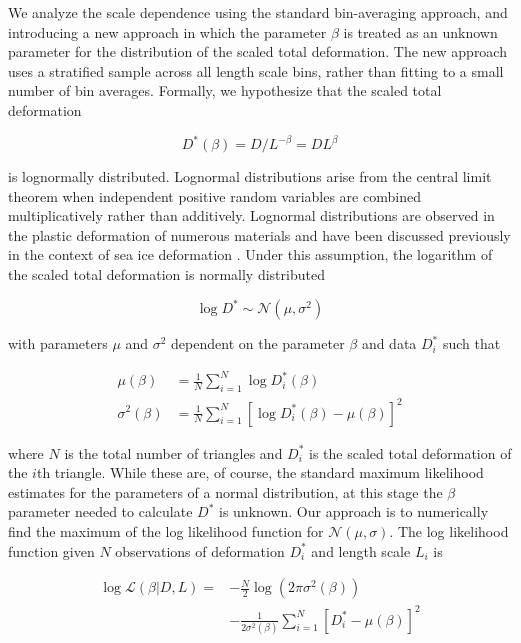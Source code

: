 \documentclass[review, jog]{igs}
\begin{document}
We analyze the scale dependence using  the standard bin-averaging approach, and  introducing a new approach in which the parameter $\beta$ is treated as an unknown parameter for the distribution of the scaled total deformation. The new approach uses a stratified sample across all length scale bins, rather than fitting to a small number of bin averages. Formally, we hypothesize that the scaled total deformation 
\begin{linenomath*}
\begin{equation}
    D^*(\beta) = D/L^{-\beta} = DL^\beta
\end{equation}
\end{linenomath*}
is lognormally distributed.
Lognormal distributions arise from the central limit theorem when independent positive random variables are combined multiplicatively rather than additively. Lognormal distributions are observed in the plastic deformation of numerous materials \citep{tang2020_LognormalDistributiona, chen2021_WhyLocal} and have been discussed previously in the context of sea ice deformation \citep{Marsan2004}.
Under this assumption, the logarithm of the scaled total deformation is normally distributed 
\begin{linenomath*}
\begin{equation}
    \log D^* \sim \mathcal N(\mu, \sigma^2) \label{eqn:scaled_ln}
\end{equation}
\end{linenomath*}
with parameters $\mu$ and $\sigma^2$ dependent on the parameter $\beta$ and data $D_i^*$ such that
\begin{linenomath*}
\begin{align}
\mu(\beta) &= \frac 1N \sum_{i=1}^N \log D_i^*(\beta) \label{eqn:mu}\\
\sigma^2(\beta) &= \frac 1N \sum_{i=1}^N \left[\log D_i^*(\beta) - \mu(\beta)\right]^2 \label{eqn:sig}
\end{align}
\end{linenomath*}
where $N$ is the total number of triangles and $D_i^*$ is the scaled total deformation of the $i$th triangle. While these are, of course, the standard maximum likelihood estimates for the parameters of a normal distribution, at this stage the $\beta$ parameter needed to calculate $D^*$ is unknown. Our approach is to numerically find the maximum of the log likelihood function for $\mathcal N(\mu, \sigma)$.
The log likelihood function given $N$ observations of deformation $D_i^*$ and length scale $L_i$ is 
\begin{linenomath*}
\begin{align}
    \log \mathcal{L}(\beta | D, L)  = &  -\frac N2 \log (2\pi \sigma^2(\beta))   \nonumber \\ 
    & - \frac{1}{2\sigma^2(\beta)}\sum_{i=1}^N \left[D_i^* - \mu(\beta)\right]^2
\end{align}
\end{linenomath*}
\end{document}
